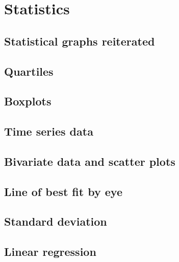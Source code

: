 \section{Statistics}
\begin{outline}

\0
\subsection{Statistical graphs reiterated}

\0
\subsection{Quartiles}

\0
\subsection{Boxplots}

\0
\subsection{Time series data}

\0
\subsection{Bivariate data and scatter plots}

\0
\subsection{Line of best fit by eye}

\0
\subsection{Standard deviation}

\0
\subsection{Linear regression}

\end{outline}
